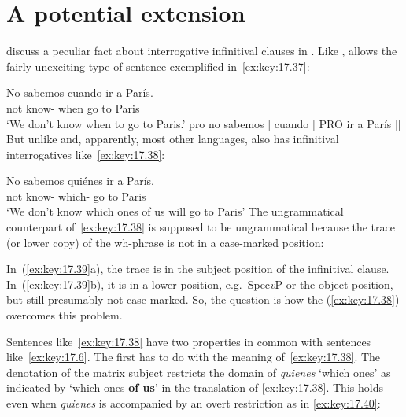 \documentclass[output=paper]{langsci/langscibook}
\begin{document}
\section{A potential extension}\label{sec:key:17.8}

\citet{BosqueMoreno1984} discuss a peculiar fact about interrogative
infinitival clauses in . Like ,  allows the fairly
unexciting type of sentence exemplified in~\eqref{ex:key:17.37}:

\ea\label{ex:key:17.37}
    \ea
    \gll    No sabemos cuando ir a París.\\
            not know-\Fpl{} when  go to Paris    \\
    \glt    ‘We don’t know when to go to Paris.’
    \ex     pro no sabemos [ cuando [ PRO  ir a París ]]
    \z
\z
But unlike  and, apparently, most other languages,  also has
infinitival interrogatives like~\eqref{ex:key:17.38}:

\ea\label{ex:key:17.38}
    \gll    No sabemos quiénes ir a París.\\
            not  know-\Fpl{} which-\Pl{} go to Paris\\
    \glt    ‘We don’t know which ones of us will go to Paris’
\z
The ungrammatical  counterpart of~\eqref{ex:key:17.38} is supposed to be
ungrammatical because the trace (or lower copy) of the wh-phrase is not in a
case-marked position:

\ea\label{ex:key:17.39}
    \z
\z
In~(\ref{ex:key:17.39}a), the trace is in the subject position of the infinitival
clause. In~(\ref{ex:key:17.39}b), it is in a lower position, e.g.\ Spec\emph{v}P
or the object position, but still presumably not case-marked. So, the question
is how the  (\ref{ex:key:17.38}) overcomes this problem.

Sentences like~\eqref{ex:key:17.38} have two properties in common with sentences
like~\eqref{ex:key:17.6}. The first has to do with the meaning
of~\eqref{ex:key:17.38}.  The denotation of the matrix subject restricts the
domain of \emph{quienes} ‘which ones’ as indicated by ‘which ones \textbf{of
us}’ in the translation of \eqref{ex:key:17.38}. This holds even when
\emph{quienes} is accompanied by an overt restriction as in
\eqref{ex:key:17.40}:
\end{document}
